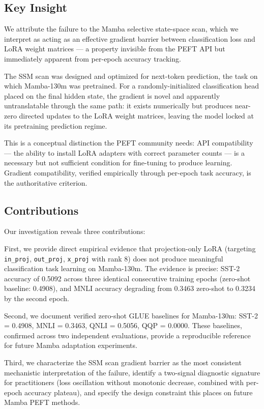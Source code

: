 \subsection{Key Insight}

We attribute the failure to the Mamba selective state-space scan, which we interpret as acting as an effective gradient barrier between classification loss and LoRA weight matrices --- a property invisible from the PEFT API but immediately apparent from per-epoch accuracy tracking.

The SSM scan was designed and optimized for next-token prediction, the task on which Mamba-130m was pretrained. For a randomly-initialized classification head placed on the final hidden state, the gradient is novel and apparently untranslatable through the same path: it exists numerically but produces near-zero directed updates to the LoRA weight matrices, leaving the model locked at its pretraining prediction regime.

This is a conceptual distinction the PEFT community needs: API compatibility --- the ability to install LoRA adapters with correct parameter counts --- is a necessary but not sufficient condition for fine-tuning to produce learning. Gradient compatibility, verified empirically through per-epoch task accuracy, is the authoritative criterion.

\subsection{Contributions}

Our investigation reveals three contributions:

First, we provide direct empirical evidence that projection-only LoRA (targeting \texttt{in\_proj}, \texttt{out\_proj}, \texttt{x\_proj} with rank 8) does not produce meaningful classification task learning on Mamba-130m. The evidence is precise: SST-2 accuracy of 0.5092 across three identical consecutive training epochs (zero-shot baseline: 0.4908), and MNLI accuracy degrading from 0.3463 zero-shot to 0.3234 by the second epoch.

Second, we document verified zero-shot GLUE baselines for Mamba-130m: SST-2 = 0.4908, MNLI = 0.3463, QNLI = 0.5056, QQP = 0.0000. These baselines, confirmed across two independent evaluations, provide a reproducible reference for future Mamba adaptation experiments.

Third, we characterize the SSM scan gradient barrier as the most consistent mechanistic interpretation of the failure, identify a two-signal diagnostic signature for practitioners (loss oscillation without monotonic decrease, combined with per-epoch accuracy plateau), and specify the design constraint this places on future Mamba PEFT methods.

